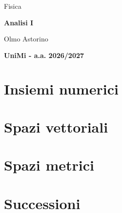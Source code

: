 \documentclass{article}
\theoremstyle{nodot}
\theoremstyle{obs}
\theoremstyle{examplestyle}
\begin{document}
\begin{titlepage}
    \thispagestyle{empty}
    \centering

    \vspace*{3cm}

    \huge{Fisica}
    \par

    \vspace{1.5cm}

    \Huge{\bfseries{Analisi I}}
    \par

    \vspace{1.5cm}

    \LARGE{Olmo Astorino}
    \par

    \vfill

    \large{\bfseries{UniMi - a.a. 2026/2027}}

\end{titlepage}

\tableofcontents

\newpage

\section{Insiemi numerici}



\section{Spazi vettoriali}



\section{Spazi metrici}



\section{Successioni}


\end{document}
